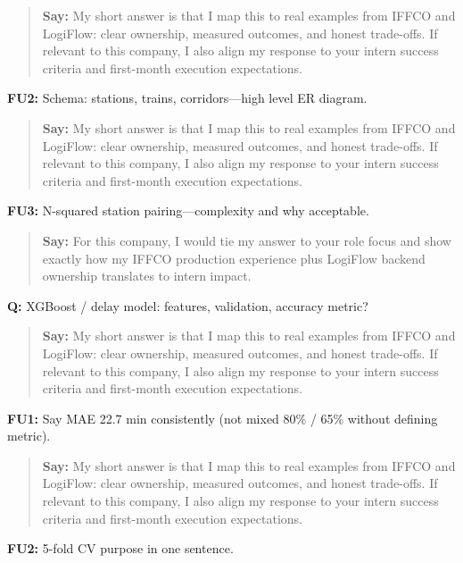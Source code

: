 \documentclass[9pt,a4paper]{article}
\begin{document}
\begin{quote}\small\textbf{Say:} My short answer is that I map this to real examples from IFFCO and LogiFlow: clear ownership, measured outcomes, and honest trade-offs. If relevant to this company, I also align my response to your intern success criteria and first-month execution expectations.\end{quote}
\vspace{2mm}
\textbf{FU2:} Schema: stations, trains, corridors---high level ER diagram.

\begin{quote}\small\textbf{Say:} My short answer is that I map this to real examples from IFFCO and LogiFlow: clear ownership, measured outcomes, and honest trade-offs. If relevant to this company, I also align my response to your intern success criteria and first-month execution expectations.\end{quote}
\vspace{2mm}
\textbf{FU3:} N-squared station pairing---complexity and why acceptable.

\begin{quote}\small\textbf{Say:} For this company, I would tie my answer to your role focus and show exactly how my IFFCO production experience plus LogiFlow backend ownership translates to intern impact.\end{quote}
\vspace{2mm}
\textbf{Q:} XGBoost / delay model: features, validation, accuracy metric?

\begin{quote}\small\textbf{Say:} My short answer is that I map this to real examples from IFFCO and LogiFlow: clear ownership, measured outcomes, and honest trade-offs. If relevant to this company, I also align my response to your intern success criteria and first-month execution expectations.\end{quote}
\vspace{2mm}
\textbf{FU1:} Say MAE 22.7 min consistently (not mixed 80\% / 65\% without defining metric).

\begin{quote}\small\textbf{Say:} My short answer is that I map this to real examples from IFFCO and LogiFlow: clear ownership, measured outcomes, and honest trade-offs. If relevant to this company, I also align my response to your intern success criteria and first-month execution expectations.\end{quote}
\vspace{2mm}
\textbf{FU2:} 5-fold CV purpose in one sentence.
\end{document}

